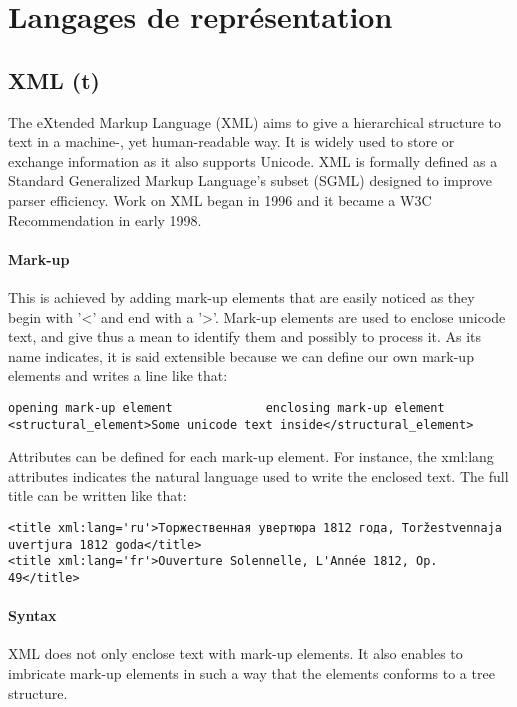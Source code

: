 \newpage
\section{Langages de représentation}\label{sec:mods}

\subsection{XML (t)}
The eXtended Markup Language (XML) aims to give a hierarchical structure to  text in a machine-, yet human-readable way. It is widely used to store or exchange information as it also supports Unicode.
XML is formally defined as a Standard Generalized Markup Language's subset (SGML) designed to improve parser efficiency. Work on XML began in 1996 and it became a W3C Recommendation in early 1998.

\paragraph{Mark-up}
This is achieved by adding mark-up elements that are easily noticed as they begin with '<' and end with a '>'. Mark-up elements are used to enclose unicode text, and give thus a mean to identify them and possibly to process it. As its name indicates, it is said extensible because we can define our own mark-up elements and writes a line like that:

\begin{Verbatim}[fontsize=\small,formatcom=\color{black!70}]
opening mark-up element 			enclosing mark-up element
<structural_element>Some unicode text inside</structural_element>
\end{Verbatim}

Attributes can be defined for each mark-up element. 
For instance, the xml:lang attributes indicates the natural language used to write the enclosed text. The  full title can be written like that:
\begin{Verbatim}[fontsize=\small,formatcom=\color{black!70}]
<title xml:lang='ru'>Торжественная увертюра 1812 года, Toržestvennaja uvertjura 1812 goda</title>
<title xml:lang='fr'>Ouverture Solennelle, L'Année 1812, Op. 49</title>
\end{Verbatim}

\paragraph{Syntax}
XML does not only enclose text with mark-up elements. It also enables to imbricate mark-up elements in such a way that the elements conforms to a tree structure. 

